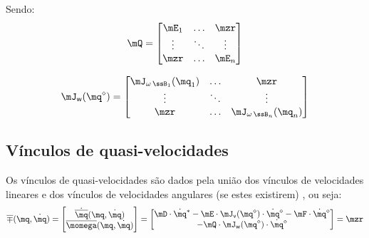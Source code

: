 \documentclass[]{politex}
\begin{document}
Sendo:
\begin{equation}
\mQ = \begin{bmatrix}
\mE_1 & \ldots & \mzr\\
\vdots & \ddots & \vdots\\
\mzr &\ldots  & \mE_{n}
\end{bmatrix}
\end{equation}

\begin{equation} \label{eq:VinculosGenericosVelocidadesAngulares}
\mJ_{\mathsf{w}}(\mq^\diamond) =
\begin{bmatrix}
\mJ_{\omega\,\ssB_1}(\mq_1) & \ldots & \mzr\\
\vdots & \ddots & \vdots\\
\mzr &\ldots  & \mJ_{\omega\,\ssB_n}(\mq_n)
\end{bmatrix}
\end{equation}

\subsection{Vínculos de quasi-velocidades} 

Os vínculos de quasi-velocidades são dados pela união dos vínculos de velocidades lineares e dos vínculos de velocidades angulares (se estes existirem) , ou seja:
\begin{equation} \label{eq:VinculosQuasiVel}
\overline{\mp}(\mq,\dot{\mq}) = \begin{bmatrix}
\dot{\overline{\mq}}(\mq,\dot{\mq}) \\
\overline{\momega}(\mq,\dot{\mq})
\end{bmatrix}
= 
\begin{bmatrix}
\mD \cdot \dot{\mq}^\ast  - \mE \cdot \mJ_{\mathsf{v}}(\mq^\diamond) \cdot \dot{\mq}^\diamond  - \mF \cdot \dot{\mq}^\diamond \\
 - \mQ \cdot \mJ_{\mathsf{w}}(\mq^\diamond) \cdot \dot{\mq}^\diamond
\end{bmatrix}
=
\mzr
\end{equation}
\end{document}
